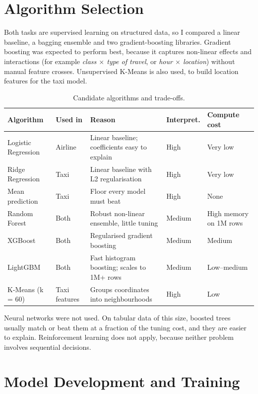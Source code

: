 \documentclass[11pt,a4paper]{article}
\begin{document}
\section{Algorithm Selection}

Both tasks are supervised learning on structured data, so I compared a linear baseline, a bagging ensemble and two gradient-boosting libraries. Gradient boosting was expected to perform best, because it captures non-linear effects and interactions (for example \emph{class $\times$ type of travel}, or \emph{hour $\times$ location}) without manual feature crosses. Unsupervised K-Means is also used, to build location features for the taxi model.

\begin{table}[H]\centering\small
\caption{Candidate algorithms and trade-offs.}
\begin{tabularx}{\textwidth}{@{}p{3.1cm}p{1.6cm}Lp{1.6cm}p{2.1cm}@{}}
\toprule
Algorithm & Used in & Reason & Interpret. & Compute cost \\
\midrule
Logistic Regression & Airline & Linear baseline; coefficients easy to explain & High & Very low \\
Ridge Regression & Taxi & Linear baseline with L2 regularisation & High & Very low \\
Mean prediction & Taxi & Floor every model must beat & High & None \\
Random Forest & Both & Robust non-linear ensemble, little tuning & Medium & High memory on 1M rows \\
XGBoost & Both & Regularised gradient boosting & Medium & Medium \\
LightGBM & Both & Fast histogram boosting; scales to 1M+ rows & Medium & Low--medium \\
K-Means (k = 60) & Taxi features & Groups coordinates into neighbourhoods & High & Low \\
\bottomrule
\end{tabularx}
\end{table}

\noindent Neural networks were not used. On tabular data of this size, boosted trees usually match or beat them at a fraction of the tuning cost, and they are easier to explain. Reinforcement learning does not apply, because neither problem involves sequential decisions.

\section{Model Development and Training}
\end{document}
